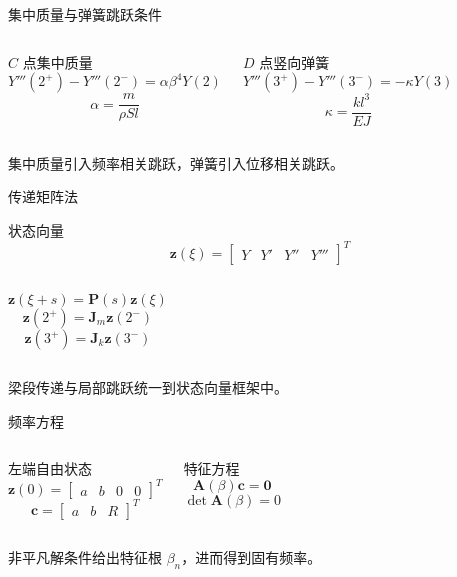 \documentclass[UTF8,aspectratio=169,10pt]{ctexbeamer}
\newcommand{\takeaway}[1]{\vfill{\small\color{tjublue}#1}}
\begin{document}
\begin{frame}{集中质量与弹簧跳跃条件}
  \begin{columns}[T,onlytextwidth]
    \begin{block}{$C$ 点集中质量}
      \[
      Y'''(2^+)-Y'''(2^-)
      =\alpha\beta^4Y(2)
      \]
      \[
      \alpha=\frac{m}{\rho Sl}
      \]
    \end{block}
    \begin{block}{$D$ 点竖向弹簧}
      \[
      Y'''(3^+)-Y'''(3^-)
      =-\kappa Y(3)
      \]
      \[
      \kappa=\frac{kl^3}{EJ}
      \]
    \end{block}
  \end{columns}
  \takeaway{集中质量引入频率相关跳跃，弹簧引入位移相关跳跃。}
\end{frame}

\begin{frame}{传递矩阵法}
  \begin{block}{状态向量}
    \[
    \mathbf z(\xi)=
    \begin{bmatrix}
    Y & Y' & Y'' & Y'''
    \end{bmatrix}^{T}
    \]
  \end{block}
  \begin{columns}[T,onlytextwidth]
    \[
    \mathbf z(\xi+s)=\mathbf P(s)\mathbf z(\xi)
    \]
    \[
    \mathbf z(2^+)=\mathbf J_m\mathbf z(2^-)
    \]
    \[
    \mathbf z(3^+)=\mathbf J_k\mathbf z(3^-)
    \]
  \end{columns}
  \takeaway{梁段传递与局部跳跃统一到状态向量框架中。}
\end{frame}

\begin{frame}{频率方程}
  \begin{columns}[T,onlytextwidth]
    \begin{block}{左端自由状态}
      \[
      \mathbf z(0)=
      \begin{bmatrix}
      a & b & 0 & 0
      \end{bmatrix}^{T}
      \]
      \[
      \mathbf c=
      \begin{bmatrix}
      a & b & R
      \end{bmatrix}^{T}
      \]
    \end{block}
    \begin{block}{特征方程}
      \[
      \mathbf A(\beta)\mathbf c=\mathbf 0
      \]
      \[
      \det \mathbf A(\beta)=0
      \]
    \end{block}
  \end{columns}
  \takeaway{非平凡解条件给出特征根 $\beta_n$，进而得到固有频率。}
\end{frame}
\end{document}
